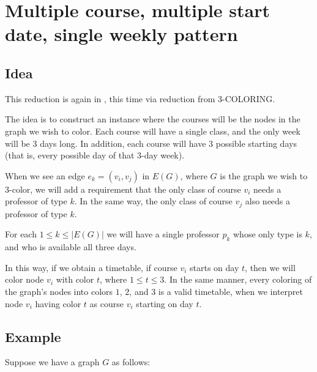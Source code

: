 \section{Multiple course, multiple start date, single weekly pattern}
\subsection{Idea}
This reduction is again in \npc, this time via reduction from 3-COLORING.

The idea is to construct an instance where the courses will be the nodes in the graph we wish to color. Each course will have a single class, and the only week will be 3 days long. In addition, each course will have 3 possible starting days (that is, every possible day of that 3-day week).

When we see an edge $e_k = (v_i, v_j)$ in $E(G)$, where $G$ is the graph we wish to 3-color, we will add a requirement that the only class of course $v_i$ needs a professor of type $k$. In the same way, the only class of course $v_j$ also needs a professor of type $k$.

For each $1 \le k \le |E(G)|$ we will have a single professor $p_k$ whose only type is $k$, and who is available all three days.

In this way, if we obtain a timetable, if course $v_i$ starts on day $t$, then we will color node $v_i$ with color $t$, where $1 \le t \le 3$. In the same manner, every coloring of the graph's nodes into colors $1$, $2$, and $3$ is a valid timetable, when we interpret node $v_i$ having color $t$ as course $v_i$ starting on day $t$.

\subsection{Example}
Suppose we have a graph $G$ as follows:

\begin{center}
\end{center}

